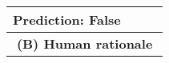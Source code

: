 \begin{table}[!h]
\begin{tabular}{@{}p{0.95\linewidth}@{}}
{\textbf{Prediction: \color[HTML]{FE0000} False}}                                                                                                                                                                                                                                                                                                                                                                                                                                                                                                                                                                                                                                                                                                                                                                                                                                                                                                                                                                                                                                                                                   \\ \midrule
\multicolumn{1}{c}{\textbf{(B) Human rationale}}                                                                                                                                                                                                                                                                                                                                                                                                                                                                                                                                                                                                                                                                                                                                                                                                                                                                                                                                                                                                                                                                                        \\ \midrule

\end{tabular}
\end{table}
